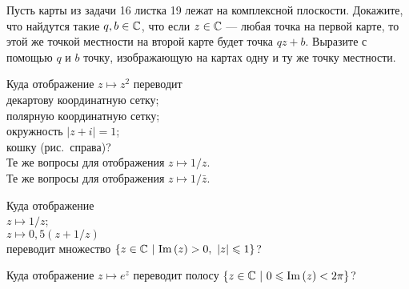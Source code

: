 \documentclass[a4paper, 12pt]{article}
\begin{document}
\vspace*{-4.5mm}
Пусть карты из задачи 16 листка 19 лежат на комплексной плоскости.
Докажите, что найдутся такие $q,b\in\mathbb{C}$, что
если $z\in\mathbb{C}$ --- любая точка на первой карте, то этой же точкой местности
на второй карте будет точка $qz+b$.
Выразите с помощью  $q$ и $b$ точку,
изображающую на картах одну и ту же точку местности.

{\hsize 13.2cm
Куда отображение $z\longmapsto z^2$
переводит\\
декартову координатную сетку;\\
полярную координатную сетку;\\
окружность $|z+i|=1$;\\
кошку (рис.~справа)?\\
Те же вопросы для отображения
$z\longmapsto 1/z$.\\
Те же вопросы для отображения
$z\longmapsto 1/\bar z$.

}



\vspace*{-5mm}



Куда отображение\\
$z\longmapsto1/z$;\\
 $z\longmapsto0,5(z+1/z)$\\
переводит множество
$\{z\in\mathbb{C}\ |\ {\rm Im}\,(z)>0,\ |z|\leqslant1\}$?


Куда отображение  $z\longmapsto e^{z}$ переводит полосу
$\{z\in\mathbb{C}\ |\ 0\leqslant  {\rm Im}\,(z)< 2\pi\}$?

\vspace*{-1mm}




\end{document}
